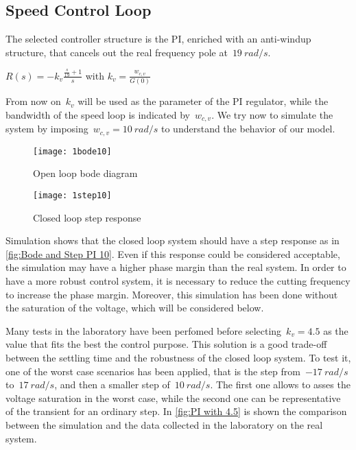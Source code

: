 \newpage
\subsection{Speed Control Loop}
The selected controller structure is the PI, enriched with an anti-windup structure, that cancels out the real frequency pole at~$19\ rad/s$.
\begin{center}
$ R(s) = -k_v \frac{\frac{s}{19}+1}{s} $
with
$ k_{v} = \frac{w_{c,v}}{G(0)} $
\end{center}
From now on~$k_v$ will be used as the parameter of the PI regulator, while the bandwidth of the speed loop is indicated by~$w_{c,v}$. We try now to simulate the system by imposing~$w_{c,v} = 10\ rad/s$ to understand the behavior of our model.
\\
\begin{figure*}[h]
	\centering
	\begin{subfigure}{0.45\columnwidth}
		\texttt{[image: 1bode10]}
		\caption{Open loop bode diagram}
	\end{subfigure}
	\begin{subfigure}{0.45\columnwidth}
		\texttt{[image: 1step10]}
		\caption{Closed loop step response}
	\end{subfigure}
	\caption{Speed control loop with $w_{c,v} = 10\ rad/s$}
	\label{fig:Bode and Step PI 10}
\end{figure*}

Simulation shows that the closed loop system should have a step response as in \cref{fig:Bode and Step PI 10}. 
Even if this response could be considered acceptable, the simulation may have a higher phase margin than the real system. In order to have a more robust control system, it is necessary to reduce the cutting frequency to increase the phase margin. Moreover, this simulation has been done without the saturation of the voltage, which will be considered below.

Many tests in the laboratory have been perfomed before selecting~$k_v=4.5$ as the value that fits the best the control purpose. This solution is a good trade-off between the settling time and the robustness of the closed loop system.
To test it, one of the worst case scenarios has been applied, that is the step from~$-17\ rad/s$ to~$17\ rad/s$, and then a smaller step of~$10\ rad/s$. The first one allows to asses the voltage saturation in the worst case, while the second one can be representative of the transient for an ordinary step.
In \cref{fig:PI with 4.5} is shown the comparison between the simulation and the data collected in the laboratory on the real system.

